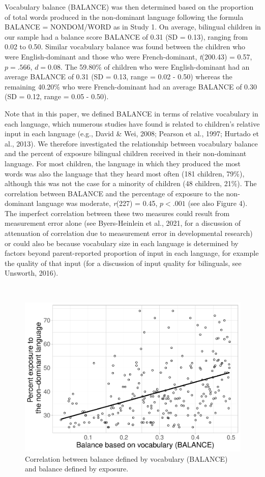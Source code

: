 \documentclass[
  english,
  ,man,floatsintext]{apa6}
\begin{document}
Vocabulary balance (BALANCE) was then determined based on the proportion of total words produced in the non-dominant language following the formula BALANCE = NONDOM/WORD as in Study 1. On average, bilingual children in our sample had a balance score BALANCE of 0.31 (SD = 0.13), ranging from 0.02 to 0.50. Similar vocabulary balance was found between the children who were English-dominant and those who were French-dominant, \emph{t}(200.43) = 0.57, \(p = .566\), \(d = 0.08\). The 59.80\% of children who were English-dominant had an average BALANCE of 0.31 (SD = 0.13, range = 0.02 - 0.50) whereas the remaining 40.20\% who were French-dominant had an average BALANCE of 0.30 (SD = 0.12, range = 0.05 - 0.50).

Note that in this paper, we defined BALANCE in terms of relative vocabulary in each language, which numerous studies have found is related to children's relative input in each language (e.g., David \& Wei, 2008; Pearson et al., 1997; Hurtado et al., 2013). We therefore investigated the relationship between vocabulary balance and the percent of exposure bilingual children received in their non-dominant language. For most children, the language in which they produced the most words was also the language that they heard most often (181 children, 79\%), although this was not the case for a minority of children (48 children, 21\%). The correlation between BALANCE and the percentage of exposure to the non-dominant language was moderate, \emph{r}(227) = 0.45, \(p < .001\) (see also Figure 4). The imperfect correlation between these two measures could result from measurement error alone (see Byers-Heinlein et al., 2021, for a discussion of attenuation of correlation due to measurement error in developmental research) or could also be because vocabulary size in each language is determined by factors beyond parent-reported proportion of input in each language, for example the quality of that input (for a discussion of input quality for bilinguals, see Unsworth, 2016).

~

\begin{figure}[H]

{\centering \includegraphics[width=0.75\linewidth]{paper_TE_bilingual_vocabulary_model_files/figure-latex/fig4-1} 

}

\caption{Correlation between balance defined by vocabulary (BALANCE) and balance defined by exposure.}\label{fig:fig4}
\end{figure}
\end{document}
